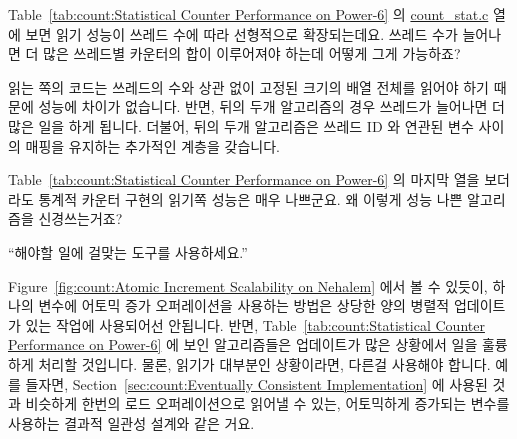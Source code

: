 \begin{enumerate}
\QuickQ{}
	Table~\ref{tab:count:Statistical Counter Performance on Power-6} 의
	\url{count_stat.c} 열에 보면 읽기 성능이 쓰레드 수에 따라
	선형적으로 확장되는데요.
	쓰레드 수가 늘어나면 더 많은 쓰레드별 카운터의 합이 이루어져야 하는데
	어떻게 그게 가능하죠?

\QuickA{}
	읽는 쪽의 코드는 쓰레드의 수와 상관 없이 고정된 크기의 배열 전체를
	읽어야 하기 때문에 성능에 차이가 없습니다.
	반면, 뒤의 두개 알고리즘의 경우 쓰레드가 늘어나면 더 많은 일을 하게
	됩니다.
	더불어, 뒤의 두개 알고리즘은 쓰레드 ID 와 연관된  변수
	사이의 매핑을 유지하는 추가적인 계층을 갖습니다.

\QuickQ{}
	Table~\ref{tab:count:Statistical Counter Performance on Power-6} 의
	마지막 열을 보더라도 통계적 카운터 구현의 읽기쪽 성능은 매우 나쁘군요.
	왜 이렇게 성능 나쁜 알고리즘을 신경쓰는거죠?

\QuickA{}
	``해야할 일에 걸맞는 도구를 사용하세요.''

	Figure~\ref{fig:count:Atomic Increment Scalability on Nehalem} 에서 볼
	수 있듯이, 하나의 변수에 어토믹 증가 오퍼레이션을 사용하는 방법은
	상당한 양의 병렬적 업데이트가 있는 작업에 사용되어선 안됩니다.
	반면, Table~\ref{tab:count:Statistical Counter Performance on Power-6}
	에 보인 알고리즘들은 업데이트가 많은 상황에서 일을 훌륭하게 처리할
	것입니다.
	물론, 읽기가 대부분인 상황이라면, 다른걸 사용해야 합니다. 예를 들자면,
	Section~\ref{sec:count:Eventually Consistent Implementation} 에 사용된
	것과 비슷하게 한번의 로드 오퍼레이션으로 읽어낼 수 있는, 어토믹하게
	증가되는 변수를 사용하는 결과적 일관성 설계와 같은 거요.
	\iffalse


\end{enumerate}
